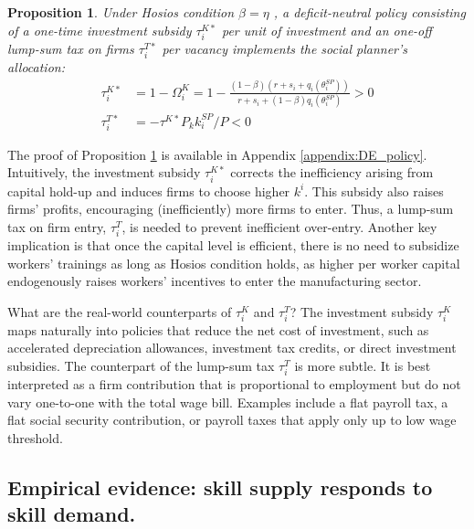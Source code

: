 \documentclass[12pt]{article} %
\newtheorem{proposition}{Proposition}
\theoremstyle{definition}
\begin{document}
\begin{proposition}\label{prop_implementation_hosios}
    Under Hosios condition  $\beta=\eta$ , a deficit-neutral policy consisting of a one-time investment subsidy $\tau^{K*}_i$ per unit of investment and an one-off lump-sum tax on firms $\tau^{T*}_i$ per vacancy implements the social planner's allocation:
\begin{align*}
    \tau_i^{K*} & = 1-\Omega_i^K=  1-\frac{(1-\beta)(r+s_i+q_i(\theta_i^{SP}))}{r+s_i+(1-\beta)q_i(\theta_i^{SP})} >0\\
    \tau_i^{T*} & = - \tau^{K*}P_kk_i^{SP}/P<0
\end{align*}
\end{proposition}



The proof of Proposition \ref{prop_implementation_hosios}   is available in Appendix \ref{appendix:DE_policy}.   
Intuitively, the investment subsidy $\tau^{K*}_i$ corrects the inefficiency arising from capital hold-up and induces firms to choose  higher $k^i$. This subsidy also raises firms' profits, encouraging (inefficiently) more firms to enter. Thus, a lump-sum tax on firm entry, $\tau^T_i$,  is needed to prevent inefficient over-entry. 
Another key implication is that once the capital level is efficient,  there is no need to subsidize workers' trainings as long as Hosios condition holds, as higher per worker capital endogenously raises  workers' incentives to enter the manufacturing sector.  

What are the real-world counterparts of $\tau_i^K$ and $\tau_i^T$? The investment subsidy $\tau_i^K$ maps naturally into policies that reduce  the net cost of investment, such as accelerated depreciation allowances,  investment tax credits, or direct investment subsidies. The counterpart of the lump-sum tax $\tau_i^T$ is more subtle. It is best interpreted as a firm contribution that is proportional to employment but do not vary one-to-one with the total wage bill. Examples include a flat payroll tax, a flat social security contribution, or payroll taxes that apply only up to  low wage threshold.


\subsection{Empirical evidence: skill supply responds to skill demand.}
\end{document}
